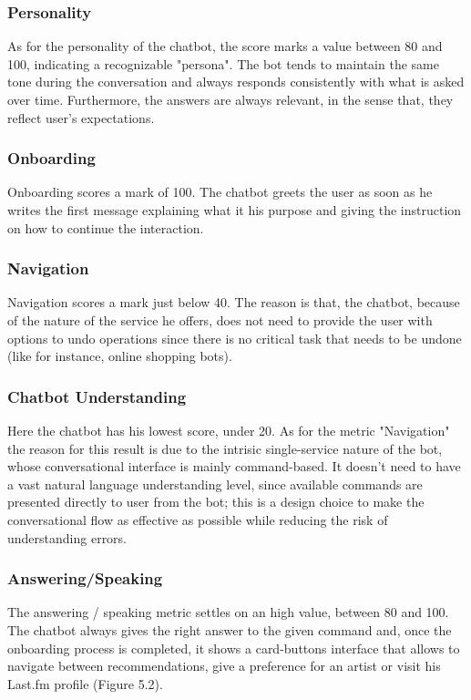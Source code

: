\documentclass[b5paper,10pt,twoside,cucitura]{toptesi}
\begin{document}
\subsubsection{Personality} As for the personality of the chatbot, the score marks a value between 80 and 100, indicating a recognizable "persona". The bot tends to maintain the same tone during the conversation and always responds consistently with what is asked over time. Furthermore, the answers are always relevant, in the sense that, they reflect user's expectations.

\subsubsection{Onboarding} Onboarding scores a mark of 100. The chatbot greets the user as soon as he writes the first message explaining what it his purpose and giving the instruction on how to continue the interaction.

\subsubsection{Navigation} Navigation scores a mark just below 40. The reason is that, the chatbot, because of the nature of the service he offers, does not need to provide the user with options to undo operations since there is no critical task that needs to be undone (like for instance, online shopping bots).

\subsubsection{Chatbot Understanding} Here the chatbot has his lowest score, under 20. As for the metric "Navigation" the reason for this result is due to the intrisic single-service nature of the bot, whose conversational interface is mainly command-based. It doesn't need to have a vast natural language understanding level, since available commands are presented directly to user from the bot; this is a design choice to make the conversational flow as effective as possible while reducing the risk of understanding errors.

\subsubsection{Answering/Speaking} The answering / speaking metric settles on an high value, between 80 and 100. The chatbot always gives the right answer to the given command and, once the onboarding process is completed, it shows a card-buttons interface that allows to navigate between recommendations, give a preference for an artist or visit his Last.fm profile (Figure 5.2).
\end{document}
